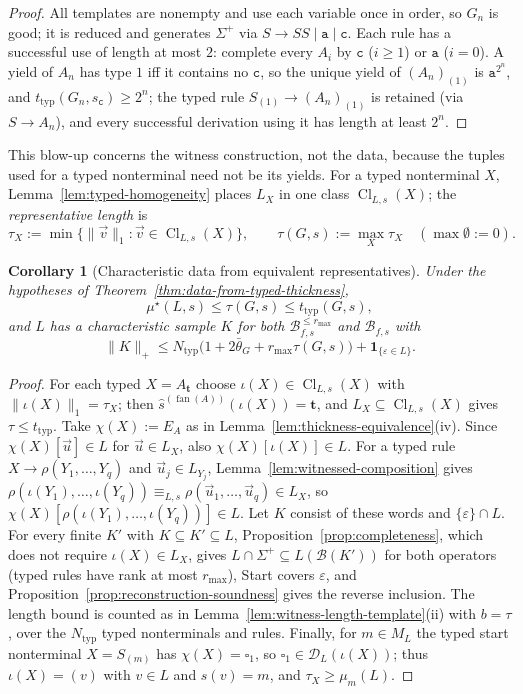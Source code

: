 \documentclass[11pt]{article}
\numberwithin{equation}{section}
\theoremstyle{plain}
\newtheorem{corollary}[theorem]{Corollary}
\theoremstyle{definition}
\theoremstyle{remark}
\newcommand{\D}{\mathcal{D}}
\newcommand{\tuple}[1]{\vec{#1}}
\newcommand{\blank}{\square}
\newcommand{\eps}{\varepsilon}
\newcommand{\fan}{\operatorname{fan}}
\begin{document}
\begin{proof}
All templates are nonempty and use each variable once in order, so $G_n$ is
good; it is reduced and generates $\Sigma^+$ via $S\to SS\mid\mathtt a\mid\mathtt c$.
Each rule has a successful use of length at most $2$: complete every $A_i$ by
$\mathtt c$ ($i\ge1$) or $\mathtt a$ ($i=0$).  A yield of $A_n$ has type $1$ iff it
contains no $\mathtt c$, so the unique yield of $(A_n)_{(1)}$ is $\mathtt a^{2^n}$,
and $t_{\mathrm{typ}}(G_n,s_{\mathtt c})\ge2^n$; the typed rule
$S_{(1)}\to(A_n)_{(1)}$ is retained (via $S\to A_n$), and every successful
derivation using it has length at least $2^n$.
\end{proof}

This blow-up concerns the witness construction, not the data, because the
tuples used for a typed nonterminal need not be its yields.  For a typed
nonterminal $X$, Lemma~\ref{lem:typed-homogeneity} places $L_X$ in one class
$\operatorname{Cl}_{L,s}(X)$; the \emph{representative length} is
\[
 \tau_X:=\min\{\|\tuple v\|_1:\tuple v\in\operatorname{Cl}_{L,s}(X)\},\qquad
 \tau(G,s):=\max_X\tau_X\quad(\max\emptyset:=0).
\]

\begin{corollary}[Characteristic data from equivalent representatives]
\label{cor:distribution-representatives}
Under the hypotheses of Theorem~\ref{thm:data-from-typed-thickness},
\[
 \mu^\star(L,s)\le\tau(G,s)\le t_{\mathrm{typ}}(G,s),
\]
and $L$ has a characteristic sample $K$ for both
$\mathcal B^{\le r_{\max}}_{f,s}$ and $\mathcal B_{f,s}$ with
\[
 \|K\|_+\le N_{\mathrm{typ}}\bigl(1+2\bar\theta_G+r_{\max}\tau(G,s)\bigr)
 +\mathbf 1_{\{\eps\in L\}}.
\]
\end{corollary}

\begin{proof}
For each typed $X=A_{\mathbf t}$ choose $\iota(X)\in\operatorname{Cl}_{L,s}(X)$ with
$\|\iota(X)\|_1=\tau_X$; then $\widehat s^{(\fan(A))}(\iota(X))=\mathbf t$, and
$L_X\subseteq\operatorname{Cl}_{L,s}(X)$ gives $\tau\le t_{\mathrm{typ}}$.  Take
$\chi(X):=E_A$ as in Lemma~\ref{lem:thickness-equivalence}(iv).  Since
$\chi(X)[\tuple u]\in L$ for $\tuple u\in L_X$, also
$\chi(X)[\iota(X)]\in L$.  For a typed rule $X\to\rho(Y_1,\ldots,Y_q)$ and
$\tuple u_j\in L_{Y_j}$, Lemma~\ref{lem:witnessed-composition} gives
$\rho(\iota(Y_1),\ldots,\iota(Y_q))\equiv_{L,s}
\rho(\tuple u_1,\ldots,\tuple u_q)\in L_X$, so
$\chi(X)[\rho(\iota(Y_1),\ldots,\iota(Y_q))]\in L$.  Let $K$ consist of these
words and $\{\eps\}\cap L$.  For every finite $K'$ with $K\subseteq K'\subseteq L$,
Proposition~\ref{prop:completeness}, which does not require $\iota(X)\in L_X$,
gives $L\cap\Sigma^+\subseteq L(\mathcal B(K'))$ for both operators (typed
rules have rank at most $r_{\max}$), Start covers $\eps$, and
Proposition~\ref{prop:reconstruction-soundness} gives the reverse inclusion.
The length bound is counted as in Lemma~\ref{lem:witness-length-template}(ii)
with $b=\tau$, over the $N_{\mathrm{typ}}$ typed nonterminals and rules.
Finally, for $m\in M_L$ the typed start nonterminal $X=S_{(m)}$ has
$\chi(X)=\blank_1$, so $\blank_1\in\D_L(\iota(X))$; thus $\iota(X)=(v)$ with
$v\in L$ and $s(v)=m$, and $\tau_X\ge\mu_m(L)$.
\end{proof}
\end{document}

